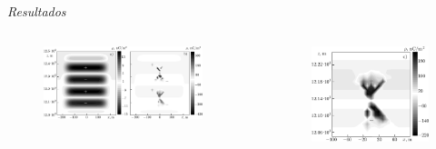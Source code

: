 \documentclass{beamer}
\begin{document}
\begin{frame}{\textit{Resultados}}
	\begin{columns}
		\begin{column}{0.67\textwidth}
			\begin{figure}
				\centering
				\includegraphics[width=0.9\textwidth]{imagens_artigo/15.png}
			\end{figure}
		\end{column}
		\begin{column}{0.33\textwidth}
			\begin{figure}
				\centering
				\includegraphics[width=\textwidth]{imagens_artigo/16.png}
			\end{figure}
		\end{column}
	\end{columns}
\end{frame}
\end{document}
